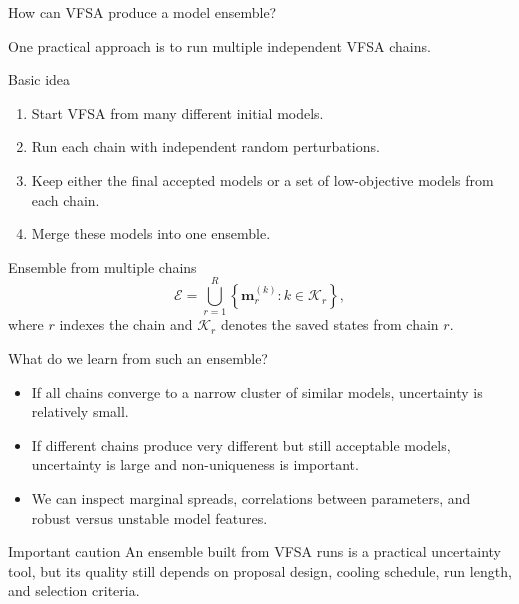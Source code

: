\documentclass[aspectratio=169]{beamer}
\renewcommand{\vec}[1]{\mathbf{#1}}
\newcommand{\mm}{ {\vec{m}} }
\begin{document}
\begin{frame}{How can VFSA produce a model ensemble?}
\small

One practical approach is to run \alert{multiple independent VFSA chains}.

\begin{block}{Basic idea}
\begin{enumerate}
    \item[--] Start VFSA from many different initial models.
    \item[--] Run each chain with independent random perturbations.
    \item[--] Keep either the final accepted models or a set of low-objective models from each chain.
    \item[--] Merge these models into one ensemble.
\end{enumerate}
\end{block}

\begin{alertblock}{Ensemble from multiple chains}
\[
\mathcal{E} = \bigcup_{r=1}^{R} \left\{ \mm_{r}^{(k)} : k \in \mathcal{K}_{r} \right\},
\]
where $r$ indexes the chain and $\mathcal{K}_{r}$ denotes the saved states from chain $r$.
\end{alertblock}
\end{frame}

\begin{frame}{What do we learn from such an ensemble?}
\small

\begin{itemize}
    \item[--] If all chains converge to a narrow cluster of similar models, uncertainty is relatively small.
    \item[--] If different chains produce very different but still acceptable models, uncertainty is large and non-uniqueness is important.
    \item[--] We can inspect marginal spreads, correlations between parameters, and robust versus unstable model features.
\end{itemize}

\begin{alertblock}{Important caution}
An ensemble built from VFSA runs is a practical uncertainty tool, but its quality still depends on proposal design, cooling schedule, run length, and selection criteria.
\end{alertblock}
\end{frame}
\end{document}

